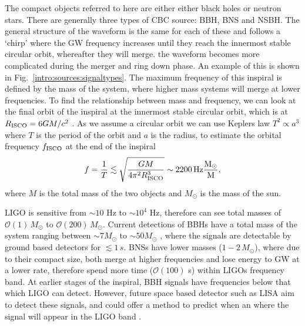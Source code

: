 The compact objects referred to here are either either black holes or neutron
stars.  There are generally three types of \gls{CBC} source: \gls{BBH},
\gls{BNS} and \gls{NSBH}.  The general structure of the waveform is the same
for each of these and follows a `chirp' where the \gls{GW} frequency increases until they reach the innermost stable circular orbit, whereafter they will merge.  the waveform becomes more complicated during the merger and ring down phase. An example of this is shown in Fig.~\ref{intro:sources:signaltypes}.  The maximum frequency of this inspiral
is defined by the mass of the system, where higher mass systems will merge at lower frequencies.
To find the relationship between mass and frequency, we can look at the final orbit of the inspiral at the innermost stable circular orbit, which is at $R_{\rm{ISCO}} = 6GM/c^2$ \citep{} .
As we assume a circular orbit we can use Keplers law $T^2 \propto a^3$ where $T$ is the period of the orbit and $a$ is the radius, to estimate the orbital frequency $f_{\rm{ISCO}}$ at the end of the inspiral
\begin{equation}
    f = \frac{1}{T} \lesssim \sqrt{\frac{GM}{4 \pi^2 R_{\rm{ISCO}}^3}} \sim 2200 \, \rm{Hz} \frac{M_{\odot}}{M},
\end{equation}
where $M$ is the total mass of the two objects and $M_{\odot}$ is the mass of the sun.

\gls{LIGO} is sensitive from $\sim 10$ Hz to $\sim
10^4$ Hz, therefore can see total masses of $\mathcal{O}(1)\,M_{\odot}$ to $\mathcal{O}(200)\, M_{\odot}$. Current detections of \glspl{BBH} have a total mass of the system ranging between $\sim 7M_{\odot}$ to $\sim 50M_{\odot}$
\citep{ligoscientificcollaborationandvirgocollaboration2019GWTC1GravitationalWave}, where the signals are detectable by ground based detectors for $\lesssim 1\,s$.  \glspl{BNS} have lower masses ($1-2\,M_{\odot}$), where due to their compact size, both merge at higher frequencies and lose energy to \gls{GW} at a lower rate, therefore spend more time ($\mathcal{O}(100)$ s) within \glspl{LIGO} frequency band.  
At earlier stages of the inspiral, \gls{BBH} signals have frequencies below that which \gls{LIGO} can detect.
However, future space based detector such as \gls{LISA} \citep{danzmann1996LISALaser} aim to detect these signals, and could offer a method to predict when an where the signal will appear in the \gls{LIGO} band \citep{sesana2016ProspectsMultiband}. 

